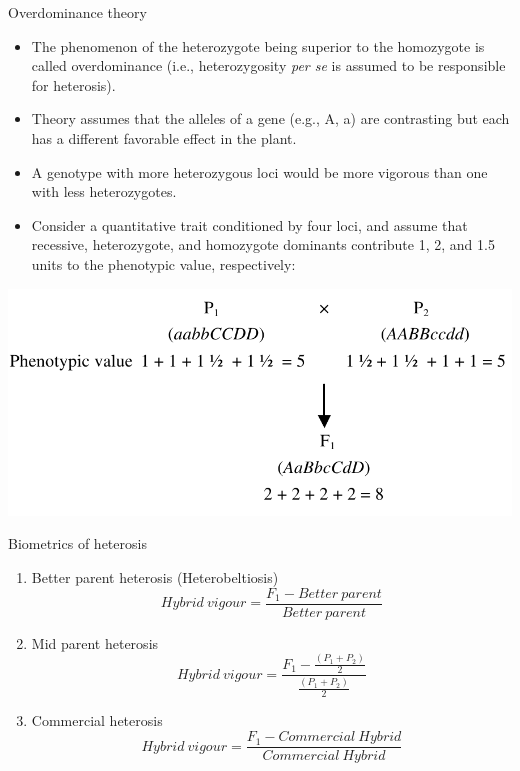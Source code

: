 \documentclass[11pt,dvipsnames,ignorenonframetext,aspectratio=169]{beamer}
\providecommand{\tightlist}{%
  \setlength{\itemsep}{0pt}\setlength{\parskip}{0pt}}
\begin{document}
\begin{frame}{Overdominance theory}
\protect\hypertarget{overdominance-theory}{}
\footnotesize

\begin{itemize}
\tightlist
\item
  The phenomenon of the heterozygote being superior to the homozygote is
  called overdominance (i.e., heterozygosity \emph{per se} is assumed to
  be responsible for heterosis).
\item
  Theory assumes that the alleles of a gene (e.g., A, a) are contrasting
  but each has a different favorable effect in the plant.
\item
  A genotype with more heterozygous loci would be more vigorous than one
  with less heterozygotes.
\item
  Consider a quantitative trait conditioned by four loci, and assume
  that recessive, heterozygote, and homozygote dominants contribute 1,
  2, and 1.5 units to the phenotypic value, respectively:
\end{itemize}

\begin{center}\includegraphics[width=0.35\linewidth]{../images/overdominance_theory} \end{center}
\end{frame}

\begin{frame}{Biometrics of heterosis}
\protect\hypertarget{biometrics-of-heterosis}{}
\begin{enumerate}
\tightlist
\item
  Better parent heterosis (Heterobeltiosis)
  \[Hybrid~vigour = \frac{F_1-Better~parent}{Better~parent}\]
\item
  Mid parent heterosis
  \[Hybrid~vigour = \frac{F_1-\frac{(P_1+P_2)}{2}}{\frac{(P_1+P_2)}{2}}\]
\item
  Commercial heterosis
  \[Hybrid~vigour = \frac{F_1-Commercial~Hybrid}{Commercial~Hybrid}\]
\end{enumerate}
\end{frame}
\end{document}
